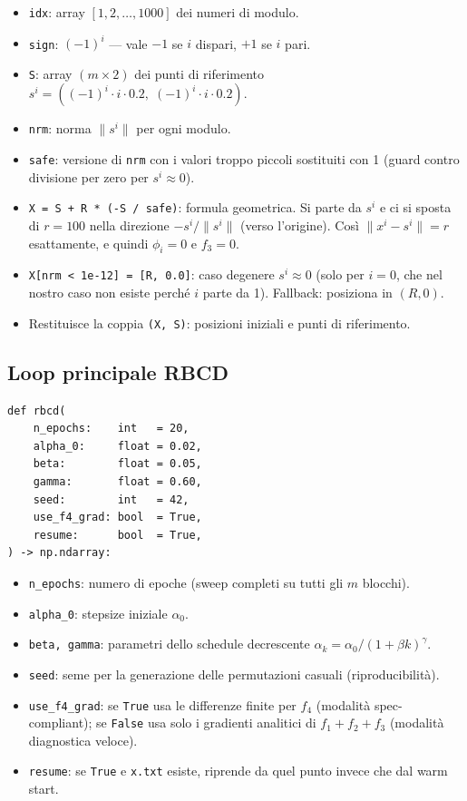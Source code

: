 \documentclass[12pt,a4paper]{article}
\theoremstyle{definition}
\begin{document}
\begin{itemize}[nosep]
  \item \texttt{idx}: array $[1, 2, \ldots, 1000]$ dei numeri di modulo.
  \item \texttt{sign}: $(-1)^i$ — vale $-1$ se $i$ dispari, $+1$ se $i$ pari.
  \item \texttt{S}: array $(m \times 2)$ dei punti di riferimento
        $s^i = ((-1)^i \cdot i \cdot 0.2,\; (-1)^i \cdot i \cdot 0.2)$.
  \item \texttt{nrm}: norma $\|s^i\|$ per ogni modulo.
  \item \texttt{safe}: versione di \texttt{nrm} con i valori troppo piccoli sostituiti con 1
        (guard contro divisione per zero per $s^i \approx 0$).
  \item \texttt{X = S + R * (-S / safe)}: formula geometrica. Si parte da $s^i$ e ci si sposta
        di $r = 100$ nella direzione $-s^i / \|s^i\|$ (verso l'origine).
        Così $\|x^i - s^i\| = r$ esattamente, e quindi $\phi_i = 0$ e $f_3 = 0$.
  \item \texttt{X[nrm < 1e-12] = [R, 0.0]}: caso degenere $s^i \approx 0$ (solo per $i=0$,
        che nel nostro caso non esiste perché $i$ parte da 1). Fallback: posiziona in $(R, 0)$.
  \item Restituisce la coppia \texttt{(X, S)}: posizioni iniziali e punti di riferimento.
\end{itemize}

\subsection{Loop principale RBCD}

\begin{lstlisting}[caption={Righe 208–268 — Firma funzione e inizializzazione}]
def rbcd(
    n_epochs:    int   = 20,
    alpha_0:     float = 0.02,
    beta:        float = 0.05,
    gamma:       float = 0.60,
    seed:        int   = 42,
    use_f4_grad: bool  = True,
    resume:      bool  = True,
) -> np.ndarray:
\end{lstlisting}

\begin{itemize}[nosep]
  \item \texttt{n\_epochs}: numero di epoche (sweep completi su tutti gli $m$ blocchi).
  \item \texttt{alpha\_0}: stepsize iniziale $\alpha_0$.
  \item \texttt{beta, gamma}: parametri dello schedule decrescente $\alpha_k = \alpha_0 / (1 + \beta k)^\gamma$.
  \item \texttt{seed}: seme per la generazione delle permutazioni casuali (riproducibilità).
  \item \texttt{use\_f4\_grad}: se \texttt{True} usa le differenze finite per $f_4$
        (modalità spec-compliant); se \texttt{False} usa solo i gradienti analitici di
        $f_1 + f_2 + f_3$ (modalità diagnostica veloce).
  \item \texttt{resume}: se \texttt{True} e \texttt{x.txt} esiste, riprende da quel punto
        invece che dal warm start.
\end{itemize}
\end{document}
